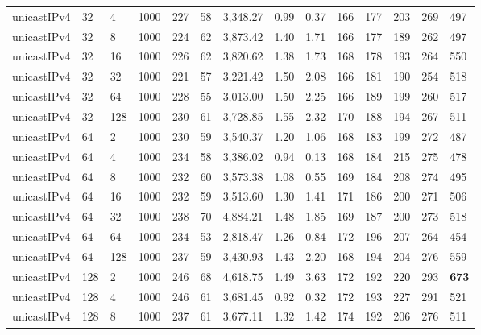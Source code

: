 \begin{table}[!htb]
\begin{tabular}{@{}llllllllllllll@{}}
unicastIPv4 & 32           & 4     & 1000 & 227  & 58  & 3,348.27 & 0.99     & 0.37     & 166 & 177 & 203 & 269 & 497  \\
unicastIPv4 & 32           & 8     & 1000 & 224  & 62  & 3,873.42 & 1.40     & 1.71     & 166 & 177 & 189 & 262 & 497  \\
unicastIPv4 & 32           & 16    & 1000 & 226  & 62  & 3,820.62 & 1.38     & 1.73     & 168 & 178 & 193 & 264 & 550  \\
unicastIPv4 & 32           & 32    & 1000 & 221  & 57  & 3,221.42 & 1.50     & 2.08     & 166 & 181 & 190 & 254 & 518  \\
unicastIPv4 & 32           & 64    & 1000 & 228  & 55  & 3,013.00 & 1.50     & 2.25     & 166 & 189 & 199 & 260 & 517  \\
unicastIPv4 & 32           & 128   & 1000 & 230  & 61  & 3,728.85 & 1.55     & 2.32     & 170 & 188 & 194 & 267 & 511  \\ \hline
unicastIPv4 & 64           & 2     & 1000 & 230  & 59  & 3,540.37 & 1.20     & 1.06     & 168 & 183 & 199 & 272 & 487  \\
unicastIPv4 & 64           & 4     & 1000 & 234  & 58  & 3,386.02 & 0.94     & 0.13     & 168 & 184 & 215 & 275 & 478  \\
unicastIPv4 & 64           & 8     & 1000 & 232  & 60  & 3,573.38 & 1.08     & 0.55     & 169 & 184 & 208 & 274 & 495  \\
unicastIPv4 & 64           & 16    & 1000 & 232  & 59  & 3,513.60 & 1.30     & 1.41     & 171 & 186 & 200 & 271 & 506  \\
unicastIPv4 & 64           & 32    & 1000 & 238  & 70  & 4,884.21 & 1.48     & 1.85     & 169 & 187 & 200 & 273 & 518  \\
unicastIPv4 & 64           & 64    & 1000 & 234  & 53  & 2,818.47 & 1.26     & 0.84     & 172 & 196 & 207 & 264 & 454  \\
unicastIPv4 & 64           & 128   & 1000 & 237  & 59  & 3,430.93 & 1.43     & 2.20     & 168 & 194 & 204 & 276 & 559  \\ \hline
unicastIPv4 & 128          & 2     & 1000 & 246  & 68  & 4,618.75 & 1.49     & 3.63     & 172 & 192 & 220 & 293 & \textbf{673}  \\
unicastIPv4 & 128          & 4     & 1000 & 246  & 61  & 3,681.45 & 0.92     & 0.32     & 172 & 193 & 227 & 291 & 521  \\
unicastIPv4 & 128          & 8     & 1000 & 237  & 61  & 3,677.11 & 1.32     & 1.42     & 174 & 192 & 206 & 276 & 511  \\

\end{tabular}
\end{table}
